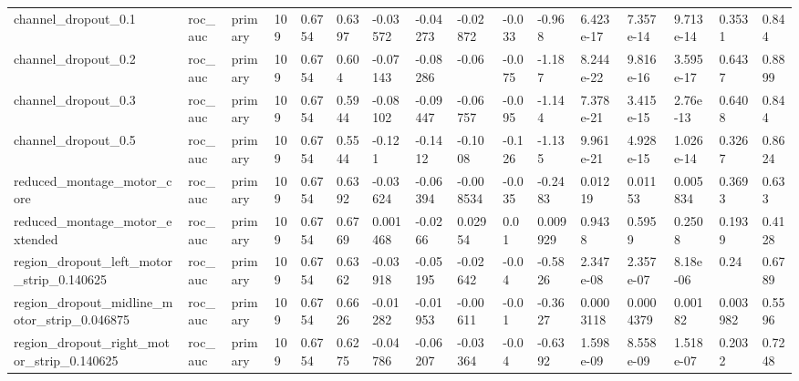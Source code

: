 \begin{tabular}{llllllllllllllll}
channel\_dropout\_0.1 & roc\_auc & primary & 109 & 0.6754 & 0.6397 & -0.03572 & -0.04273 & -0.02872 & -0.033 & -0.968 & 6.423e-17 & 7.357e-14 & 9.713e-14 & 0.3531 & 0.844 \\
channel\_dropout\_0.2 & roc\_auc & primary & 109 & 0.6754 & 0.604 & -0.07143 & -0.08286 & -0.06 & -0.075 & -1.187 & 8.244e-22 & 9.816e-16 & 3.595e-17 & 0.6437 & 0.8899 \\
channel\_dropout\_0.3 & roc\_auc & primary & 109 & 0.6754 & 0.5944 & -0.08102 & -0.09447 & -0.06757 & -0.095 & -1.144 & 7.378e-21 & 3.415e-15 & 2.76e-13 & 0.6408 & 0.844 \\
channel\_dropout\_0.5 & roc\_auc & primary & 109 & 0.6754 & 0.5544 & -0.121 & -0.1412 & -0.1008 & -0.126 & -1.135 & 9.961e-21 & 4.928e-15 & 1.026e-14 & 0.3267 & 0.8624 \\
reduced\_montage\_motor\_core & roc\_auc & primary & 109 & 0.6754 & 0.6392 & -0.03624 & -0.06394 & -0.008534 & -0.035 & -0.2483 & 0.01219 & 0.01153 & 0.005834 & 0.3693 & 0.633 \\
reduced\_montage\_motor\_extended & roc\_auc & primary & 109 & 0.6754 & 0.6769 & 0.001468 & -0.0266 & 0.02954 & 0.01 & 0.009929 & 0.9438 & 0.5959 & 0.2508 & 0.1939 & 0.4128 \\
region\_dropout\_left\_motor\_strip\_0.140625 & roc\_auc & primary & 109 & 0.6754 & 0.6362 & -0.03918 & -0.05195 & -0.02642 & -0.04 & -0.5826 & 2.347e-08 & 2.357e-07 & 8.18e-06 & 0.24 & 0.6789 \\
region\_dropout\_midline\_motor\_strip\_0.046875 & roc\_auc & primary & 109 & 0.6754 & 0.6626 & -0.01282 & -0.01953 & -0.00611 & -0.01 & -0.3627 & 0.0003118 & 0.0004379 & 0.00182 & 0.003982 & 0.5596 \\
region\_dropout\_right\_motor\_strip\_0.140625 & roc\_auc & primary & 109 & 0.6754 & 0.6275 & -0.04786 & -0.06207 & -0.03364 & -0.04 & -0.6392 & 1.598e-09 & 8.558e-09 & 1.518e-07 & 0.2032 & 0.7248 \\
\bottomrule
\end{tabular}
